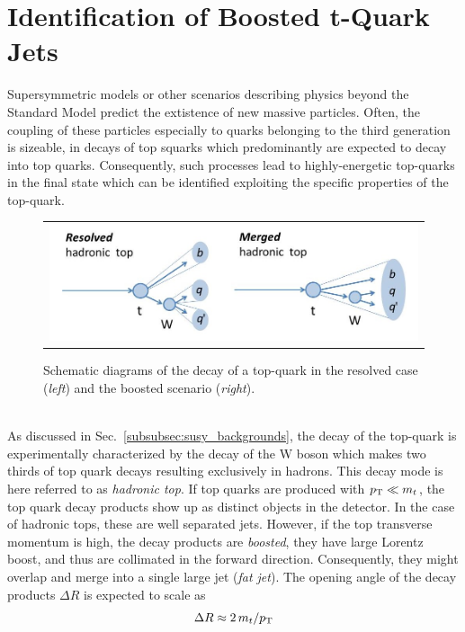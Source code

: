 \section{Identification of Boosted t-Quark Jets }
\label{sec:boosted_tops}
Supersymmetric models or other scenarios describing physics beyond the Standard Model predict the extistence of new massive particles. Often, the coupling of these particles especially to quarks belonging to the third generation is sizeable, \eg in decays of top squarks which predominantly are expected to decay into top quarks. Consequently, such processes lead to highly-energetic top-quarks in the final state which can be identified exploiting the specific properties of the top-quark. 
\begin{figure}[!tp]
  \centering 
  \begin{tabular}{c}
    \includegraphics[width=1.0\textwidth]{figures/BoostedTops.jpg} 
  \end{tabular}
  \caption{Schematic diagrams of the decay of a top-quark in the resolved case (\textit{left}) and the boosted scenario (\textit{right}).}
  \label{fig:boosted_top}
\end{figure}
\\
As discussed in Sec.~\ref{subsubsec:susy_backgrounds}, the decay of the top-quark is experimentally characterized by the decay of the W boson which makes two thirds of top quark decays resulting exclusively in hadrons. This decay mode is here referred to as \textit{hadronic top}. If top quarks are produced with $p_{\text{T}} \ll m_t$, the top quark decay products show up as distinct objects in the detector. In the case of hadronic tops, these are well separated jets. However, if the top transverse momentum is high, the decay products are \textit{boosted}, \ie they have large Lorentz boost, and thus are collimated in the forward direction. Consequently, they might overlap and merge into a single large jet (\textit{fat jet}). The opening angle of the decay products $\Delta R$ is expected to scale as
\begin{equation}
 \Delta R \approx 2\,m_{t} /p_{\text{T}}
 \label{eq:rule-of-thumb}
\end{equation}  
